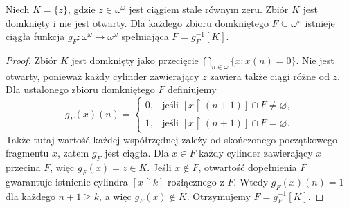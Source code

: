 \begin{twierdzenie}
\label{thm:wadge-closed-complete}
Niech $K=\{z\}$, gdzie $z\in\omega^\omega$
jest ciągiem stale równym zeru.
Zbiór $K$ jest domknięty i nie jest otwarty.
Dla każdego zbioru domkniętego $F\subseteq\omega^\omega$
istnieje ciągła funkcja $g_F:\omega^\omega\to\omega^\omega$
spełniająca $F=g_F^{-1}[K]$.
\end{twierdzenie}
\begin{proof}
Zbiór $K$ jest domknięty jako przecięcie
$\bigcap_{n\in\omega}\{x:x(n)=0\}$.
Nie jest otwarty, ponieważ każdy cylinder
zawierający $z$ zawiera także ciągi różne od $z$.
Dla ustalonego zbioru domkniętego $F$ definiujemy
\[
 g_F(x)(n)=
 \begin{cases}
  0,&\text{jeśli }[x\upharpoonright(n+1)]\cap F\ne\varnothing,\\
  1,&\text{jeśli }[x\upharpoonright(n+1)]\cap F=\varnothing.
 \end{cases}
\]
Także tutaj wartość każdej współrzędnej zależy
od skończonego początkowego fragmentu $x$,
zatem $g_F$ jest ciągła. Dla $x\in F$
każdy cylinder zawierający $x$ przecina $F$,
więc $g_F(x)=z\in K$.
Jeśli $x\notin F$, otwartość dopełnienia $F$
gwarantuje istnienie cylindra
$[x\upharpoonright k]$ rozłącznego z $F$.
Wtedy $g_F(x)(n)=1$ dla każdego $n+1\ge k$,
a więc $g_F(x)\notin K$.
Otrzymujemy $F=g_F^{-1}[K]$.
\end{proof}

